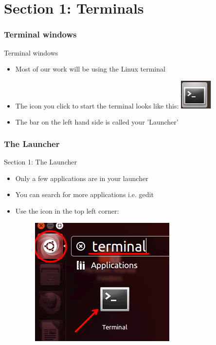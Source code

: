 \part{Section 1: Terminals}
\begin{frame}
\partpage
\end{frame}

\section{Terminal windows}
\begin{frame}{Terminal windows}
\begin{itemize}
\item Most of our work will be using the Linux terminal
\item The icon you click to start the terminal looks like this:
\includegraphics{imgs/terminal-icon.png}
\item The bar on the left hand side is called your 'Launcher'
\end{itemize}
\end{frame}

\section{The Launcher}
\begin{frame}{Section 1: The Launcher}
\begin{itemize}
\item Only a few applications are in your launcher
\item You can search for more applications i.e. gedit
\item Use the icon in the top left corner:
\begin{figure}[h]
\includegraphics[height=0.3\textheight]{imgs/ubuntu-search-icon.png}
\end{figure}
\end{itemize}
\end{frame}

